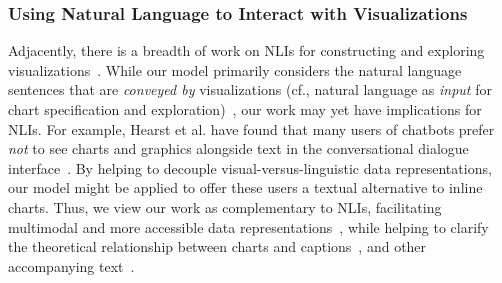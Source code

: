 \subsubsection{Using Natural Language to Interact with Visualizations}

Adjacently, there is a breadth of work on \ac{NLIs} for constructing and exploring visualizations~\cite{narechania_nl4dv_2021, hearst_toward_2019, setlur_inferencing_2019, kim_answering_2020}.
While our model primarily considers the natural language sentences that are \emph{conveyed by} visualizations (cf., natural language as \emph{input} for chart specification and exploration)~\cite{srinivasan_collecting_2021}, our work may yet have implications for \ac{NLIs}.
For example, Hearst et al. have found that many users of chatbots prefer \emph{not} to see charts and graphics alongside text in the conversational dialogue interface~\cite{hearst_would_2019}.
By helping to decouple visual-versus-linguistic data representations, our model might be applied to offer these users a textual alternative to inline charts.
Thus, we view our work as complementary to \ac{NLIs}, facilitating multimodal and more accessible data representations~\cite{kim_facilitating_2018}, while helping to clarify the theoretical relationship between charts and captions~\cite{kim_towards_2021, ottley_curious_2019}, and other accompanying text~\cite{xiong_curse_2020, kong_frames_2018, kong_trust_2019, adar_communicative_2020}.